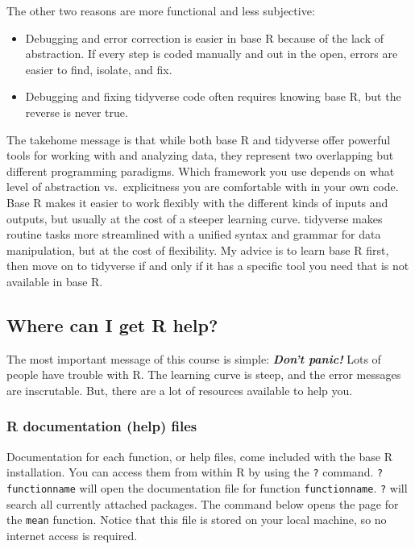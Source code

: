 \documentclass[
  13,
  letterpaper,
]{report}
\begin{document}
The other two reasons are more functional and less subjective:

\begin{itemize}
\item
  Debugging and error correction is easier in base R because of the lack
  of abstraction. If every step is coded manually and out in the open,
  errors are easier to find, isolate, and fix.
\item
  Debugging and fixing tidyverse code often requires knowing base R, but
  the reverse is never true.
\end{itemize}

The takehome message is that while both base R and tidyverse offer
powerful tools for working with and analyzing data, they represent two
overlapping but different programming paradigms. Which framework you use
depends on what level of abstraction vs.~explicitness you are
comfortable with in your own code. Base R makes it easier to work
flexibly with the different kinds of inputs and outputs, but usually at
the cost of a steeper learning curve. tidyverse makes routine tasks more
streamlined with a unified syntax and grammar for data manipulation, but
at the cost of flexibility. My advice is to learn base R first, then
move on to tidyverse if and only if it has a specific tool you need that
is not available in base R.

\subsection{Where can I get R help?}\label{sec-r-faq-help}

The most important message of this course is simple: \textbf{\emph{Don't
panic!}} Lots of people have trouble with R. The learning curve is
steep, and the error messages are inscrutable. But, there are a lot of
resources available to help you.

\subsubsection{R documentation (help) files}\label{sec-r-faq-help-doc}

Documentation for each function, or help files, come included with the
base R installation. You can access them from within R by using the
\texttt{?} command. \texttt{?functionname} will open the documentation
file for function \texttt{functionname}. \texttt{?} will search all
currently attached packages. The command below opens the page for the
\texttt{mean} function. Notice that this file is stored on your local
machine, so no internet access is required.
\end{document}
